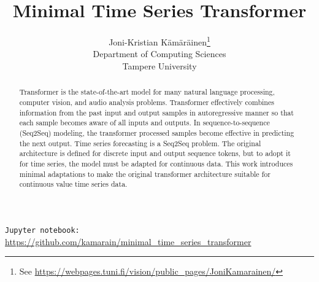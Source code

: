 \documentclass[final]{article}
\title{Minimal Time Series Transformer}
\author{%
  Joni-Kristian K{\"a}m{\"a}r{\"a}inen\thanks{See \url{https://webpages.tuni.fi/vision/public_pages/JoniKamarainen/}}\\
  Department of Computing Sciences\\
  Tampere University
}
\begin{document}
\maketitle


\begin{abstract}
Transformer is the state-of-the-art model for many natural language processing, computer vision, and audio analysis problems. Transformer effectively combines information from the past input and output samples in autoregressive manner so that each sample becomes aware of all inputs and outputs. In sequence-to-sequence (Seq2Seq) modeling, the transformer processed samples become effective in predicting the next output. Time series forecasting is a Seq2Seq problem. The original architecture is defined for discrete input and output sequence tokens, but to adopt it for time series, the model must be adapted for continuous data. This work introduces minimal adaptations to make the original transformer architecture suitable for continuous value time series data.
\end{abstract}

\begin{center}
\texttt{Jupyter notebook:} \url{https://github.com/kamarain/minimal_time_series_transformer}
\end{center}

\end{document}
